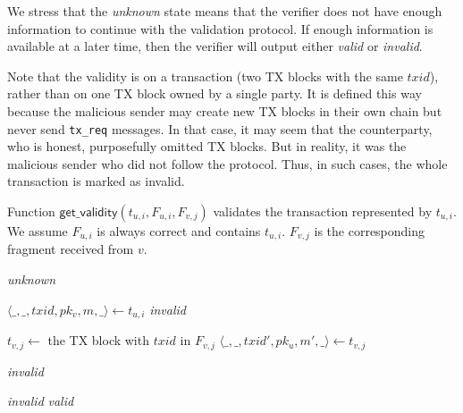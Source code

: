 We stress that the \emph{unknown} state means that the verifier does not have enough information to continue with the validation protocol.
If enough information is available at a later time, then the verifier will output either \emph{valid} or \emph{invalid}.

Note that the validity is on a transaction (two TX blocks with the same $txid$), rather than on one TX block owned by a single party.
It is defined this way because the malicious sender may create new TX blocks in their own chain but never send \texttt{tx\_req} messages.
In that case, it may seem that the counterparty, who is honest, purposefully omitted TX blocks.
But in reality, it was the malicious sender who did not follow the protocol.
Thus, in such cases, the whole transaction is marked as invalid.


\begin{algorithm}
\caption{Function $\textsf{get\_validity}(t_{u, i}, F_{u, i}, F_{v, j})$ validates the transaction represented by $t_{u, i}$.
We assume $F_{u, i}$ is always correct and contains $t_{u, i}$.
$F_{v, j}$ is the corresponding fragment received from $v$.}
\label{alg:get-validity}

\begin{algorithmic}[1]

        \State \Return \emph{unknown}
    \EndIf
    \State

    \label{line:valid-fragment}
    \State $\langle \_, \_, txid, pk_v, m, \_ \rangle \gets t_{u, i}$
        \State \Return \emph{invalid}
    \EndIf
    \State

    \State $t_{v, j} \gets $ the TX block with $txid$ in $F_{v, j}$
    \State $\langle \_, \_, txid', pk_u, m', \_ \rangle \gets t_{v, j}$ 

        \State \Return \emph{invalid}
    \EndIf
    \State

        \State \Return \emph{invalid}
    \EndIf
    \State \Return \emph{valid}
\end{algorithmic}
\end{algorithm}

